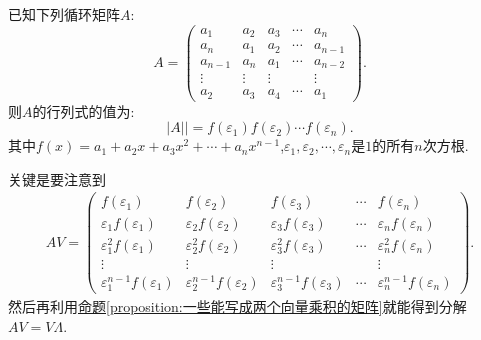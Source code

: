 \documentclass[lang=cn,newtx,10pt,scheme=chinese]{elegantbook}
\begin{document}
\begin{proposition}[循环行列式计算公式]\label{proposition:循环行列式计算公式}
已知下列循环矩阵\(A\):
\[
A = 
\begin{pmatrix}
a_1 & a_2 & a_3 & \cdots & a_n\\
a_n & a_1 & a_2 & \cdots & a_{n - 1}\\
a_{n - 1} & a_n & a_1 & \cdots & a_{n - 2}\\
\vdots & \vdots & \vdots & & \vdots\\
a_2 & a_3 & a_4 & \cdots & a_1
\end{pmatrix}.
\]
则\(A\)的行列式的值为:
\[
|A|| = f(\varepsilon_1)f(\varepsilon_2)\cdots f(\varepsilon_n).
\]
其中\(f(x)=a_1 + a_2x + a_3x^2+\cdots+a_nx^{n - 1}\),\(\varepsilon_1,\varepsilon_2,\cdots,\varepsilon_n\)是\(1\)的所有\(n\)次方根.
\end{proposition}
\begin{note}
关键是要注意到
\begin{align*}
AV = 
\begin{pmatrix}
f(\varepsilon_1) & f(\varepsilon_2) & f(\varepsilon_3) & \cdots & f(\varepsilon_n)\\
\varepsilon_1f(\varepsilon_1) & \varepsilon_2f(\varepsilon_2) & \varepsilon_3f(\varepsilon_3) & \cdots & \varepsilon_nf(\varepsilon_n)\\
\varepsilon_1^2f(\varepsilon_1) & \varepsilon_2^2f(\varepsilon_2) & \varepsilon_3^2f(\varepsilon_3) & \cdots & \varepsilon_n^2f(\varepsilon_n)\\
\vdots & \vdots & \vdots & & \vdots\\
\varepsilon_1^{n - 1}f(\varepsilon_1) & \varepsilon_2^{n - 1}f(\varepsilon_2) & \varepsilon_3^{n - 1}f(\varepsilon_3) & \cdots & \varepsilon_n^{n - 1}f(\varepsilon_n)
\end{pmatrix}.
\end{align*}
然后再利用\hyperref[proposition:一些能写成两个向量乘积的矩阵]{命题\ref{proposition:一些能写成两个向量乘积的矩阵}}就能得到分解$AV = V\Lambda$.
\end{note}
\end{document}
